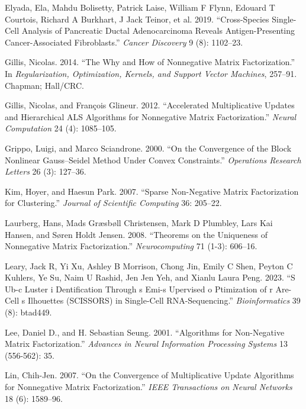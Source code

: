 \documentclass[
]{article}
\newlength{\cslhangindent}
\newenvironment{CSLReferences}[2] %
 {\begin{list}{}{%
  \setlength{\itemindent}{0pt}
  \setlength{\leftmargin}{0pt}
  \setlength{\parsep}{0pt}
  \ifodd #1
   \setlength{\leftmargin}{\cslhangindent}
   \setlength{\itemindent}{-1\cslhangindent}
  \fi
  \setlength{\itemsep}{#2\baselineskip}}}
 {\end{list}}
\begin{document}
\begin{CSLReferences}{1}{0}
Elyada, Ela, Mahdu Bolisetty, Patrick Laise, William F Flynn, Edouard T
Courtois, Richard A Burkhart, J Jack Teinor, et al. 2019.
{``Cross-Species Single-Cell Analysis of Pancreatic Ductal
Adenocarcinoma Reveals Antigen-Presenting Cancer-Associated
Fibroblasts.''} \emph{Cancer Discovery} 9 (8): 1102--23.

Gillis, Nicolas. 2014. {``The Why and How of Nonnegative Matrix
Factorization.''} In \emph{Regularization, Optimization, Kernels, and
Support Vector Machines}, 257--91. Chapman; Hall/CRC.

Gillis, Nicolas, and François Glineur. 2012. {``Accelerated
Multiplicative Updates and Hierarchical ALS Algorithms for Nonnegative
Matrix Factorization.''} \emph{Neural Computation} 24 (4): 1085--105.

Grippo, Luigi, and Marco Sciandrone. 2000. {``On the Convergence of the
Block Nonlinear Gauss--Seidel Method Under Convex Constraints.''}
\emph{Operations Research Letters} 26 (3): 127--36.

Kim, Hoyer, and Haesun Park. 2007. {``Sparse Non-Negative Matrix
Factorization for Clustering.''} \emph{Journal of Scientific Computing}
36: 205--22.

Laurberg, Hans, Mads Græsbøll Christensen, Mark D Plumbley, Lars Kai
Hansen, and Søren Holdt Jensen. 2008. {``Theorems on the Uniqueness of
Nonnegative Matrix Factorization.''} \emph{Neurocomputing} 71 (1-3):
606--16.

Leary, Jack R, Yi Xu, Ashley B Morrison, Chong Jin, Emily C Shen, Peyton
C Kuhlers, Ye Su, Naim U Rashid, Jen Jen Yeh, and Xianlu Laura Peng.
2023. {``S Ub-c Luster i Dentification Through s Emi-s Upervised o
Ptimization of r Are-Cell s Ilhouettes (SCISSORS) in Single-Cell
RNA-Sequencing.''} \emph{Bioinformatics} 39 (8): btad449.

Lee, Daniel D., and H. Sebastian Seung. 2001. {``Algorithms for
Non-Negative Matrix Factorization.''} \emph{Advances in Neural
Information Processing Systems} 13 (556-562): 35.

Lin, Chih-Jen. 2007. {``On the Convergence of Multiplicative Update
Algorithms for Nonnegative Matrix Factorization.''} \emph{IEEE
Transactions on Neural Networks} 18 (6): 1589--96.


\end{CSLReferences}
\end{document}
